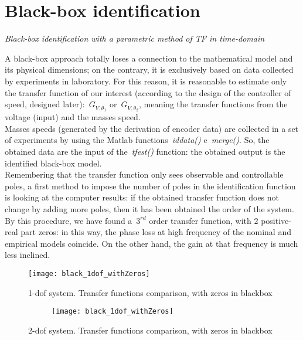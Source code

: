 \section{Black-box identification}

\textit{Black-box identification with a parametric method of TF in time-domain} \\

\par A black-box approach totally loses a connection to the mathematical model and its physical dimensions; on the contrary, it is exclusively based on data collected by experiments in laboratory.
For this reason, it is reasonable to estimate only the transfer function of our interest (according to the design of the controller of speed, designed later):~$G_{V,\dot{\theta_1}}$ or~$G_{V,\dot{\theta_2}}$, meaning the transfer functions from the voltage (input) and the masses speed. \\

Masses speeds (generated by the derivation of encoder data) are collected in a set of experiments by using the Matlab functions~\textit{iddata()} e~\textit{merge()}. So, the obtained data are the input of the~\textit{tfest()} function: the obtained output is the identified black-box model. \\

Remembering that the transfer function only sees observable and controllable poles, a first method to impose the number of poles in the identification function is looking at the computer results: if the obtained transfer function does not change by adding more poles, then it has been obtained the order of the system.
By this procedure, we have found a~$3^{rd}$ order transfer function, with 2 positive-real part zeros: in this way, the phase loss at high frequency of the nominal and empirical models coincide. On the other hand, the gain at that frequency is much less inclined.

\begin{figure*}[h]
	\centering
	\texttt{[image: black\_1dof\_withZeros]}
	\caption{1-dof system. Transfer functions comparison, with zeros in blackbox}
\end{figure*}
\begin{figure*}[h]
	\centering
	\begin{subfigure}{\columnwidth}
	\end{subfigure}
	\begin{subfigure}{\columnwidth}
		\texttt{[image: black\_1dof\_withZeros]}
	\end{subfigure}
	\caption{2-dof system. Transfer functions comparison, with zeros in blackbox}
\end{figure*}


